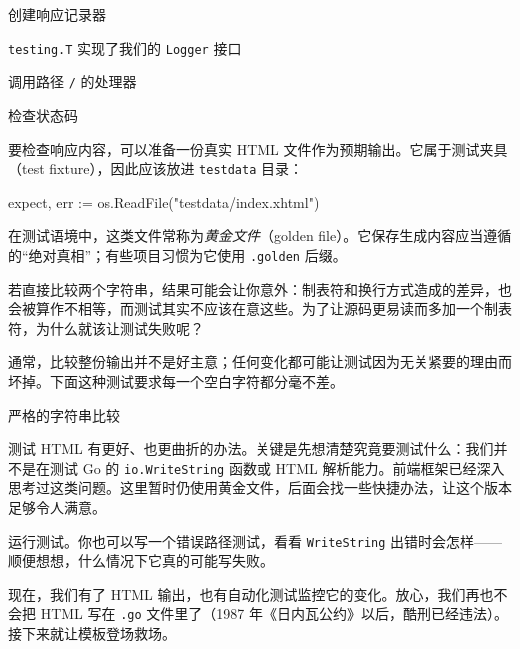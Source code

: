 \begin{codeannotations}
\item 创建响应记录器
\item \texttt{testing.T} 实现了我们的 \texttt{Logger} 接口
\item 调用路径 \texttt{/} 的处理器
\item 检查状态码
\end{codeannotations}

要检查响应内容，可以准备一份真实 HTML 文件作为预期输出。它属于测试夹具（test fixture），因此应该放进 \texttt{testdata} 目录：

\begin{gocode}[]
expect, err := os.ReadFile("testdata/index.xhtml")
\end{gocode}

在测试语境中，这类文件常称为\emph{黄金文件}（golden file）。它保存生成内容应当遵循的“绝对真相”；有些项目习惯为它使用 \texttt{.golden} 后缀。

若直接比较两个字符串，结果可能会让你意外：制表符和换行方式造成的差异，也会被算作不相等，而测试其实不应该在意这些。为了让源码更易读而多加一个制表符，为什么就该让测试失败呢？

通常，比较整份输出并不是好主意；任何变化都可能让测试因为无关紧要的理由而坏掉。下面这种测试要求每一个空白字符都分毫不差。


\begin{codeannotations}
\item 严格的字符串比较
\end{codeannotations}

测试 HTML 有更好、也更曲折的办法。关键是先想清楚究竟要测试什么：我们并不是在测试 Go 的 \texttt{io.WriteString} 函数或 HTML 解析能力。前端框架已经深入思考过这类问题。这里暂时仍使用黄金文件，后面会找一些快捷办法，让这个版本足够令人满意。

运行测试。你也可以写一个错误路径测试，看看 \texttt{WriteString} 出错时会怎样——顺便想想，什么情况下它真的可能写失败。

现在，我们有了 HTML 输出，也有自动化测试监控它的变化。放心，我们再也不会把 HTML 写在 \texttt{.go} 文件里了（1987 年《日内瓦公约》以后，酷刑已经违法）。接下来就让模板登场救场。

